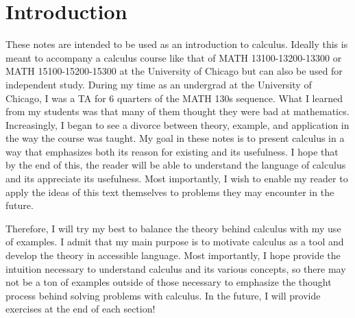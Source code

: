 
\maketitle


\section*{\hfill Introduction \hfill}

These notes are intended to be used as an introduction to calculus. Ideally this is meant to accompany a calculus course like that of MATH 13100-13200-13300 or MATH 15100-15200-15300 at the University of Chicago but can also be used for independent study. During my time as an undergrad at the University of Chicago, I was a TA for 6 quarters of the MATH 130s sequence. What I learned from my students was that many of them thought they were bad at mathematics. Increasingly, I began to see a divorce between theory, example, and application in the way the course was taught. My goal in these notes is to present calculus in a way that emphasizes both its reason for existing and its usefulness. I hope that by the end of this, the reader will be able to understand the language of calculus and its appreciate its usefulness. Most importantly, I wish to enable my reader to apply the ideas of this text themselves to problems they may encounter in the future.

Therefore, I will try my best to balance the theory behind calculus with my use of examples. I admit that my main purpose is to motivate calculus as a tool and develop the theory in accessible language. Most importantly, I hope provide the intuition necessary to understand calculus and its various concepts, so there may not be a ton of examples outside of those necessary to emphasize the thought process behind solving problems with calculus. In the future, I will provide exercises at the end of each section!


\thispagestyle{empty}

\newpage
\tableofcontents
\thispagestyle{empty}
\newpage

\setcounter{page}{1}
